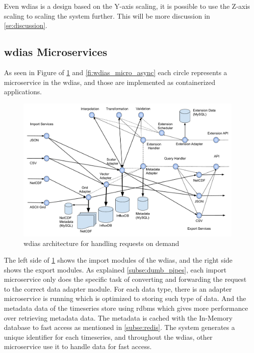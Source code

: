 Even \acrshort{wdias} is a design based on the Y-axis scaling, it is possible to use the Z-axis scaling to scaling the system further. This will be more discussion in \cref{se:discussion}.




\subsection{\acrshort{wdias} Microservices}
\label{sebse:wdias_microservices}
As seen in Figure of \cref{fi:wdias_micro_on_demand} and \cref{fi:wdias_micro_async} each circle represents a microservice in the \acrshort{wdias}, and those are implemented as containerized applications.
\begin{figure}[htp]
    \centering
    \includegraphics[width=1\textwidth]{method/microservice/microservice_architecture-handle_on_demand-v4.pdf}
    \caption{\acrshort{wdias} architecture for handling requests on demand}
    \label{fi:wdias_micro_on_demand}
\end{figure}
The left side of \cref{fi:wdias_micro_on_demand} shows the import modules of the \acrshort{wdias}, and the right side shows the export modules. As explained \cref{subse:dumb_pipes}, each import microservice only does the specific task of converting and forwarding the request to the correct data adapter module.
For each data type, there is an adapter microservice is running which is optimized to storing such type of data. And the metadata data of the timeseries store using \acrshort{rdbms} which gives more performance over retrieving metadata data. The metadata is cached with the In-Memory database to fast access as mentioned in \cref{subse:redis}.
The system generates a unique identifier for each timeseries, and throughout the \acrshort{wdias}, other microservice use it to handle data for fast access.


